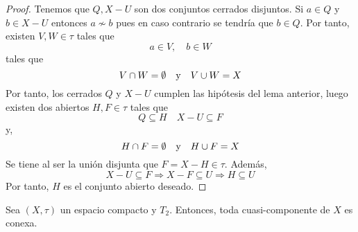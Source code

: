 \documentclass[12pt]{report}
\theoremstyle{largebreak}
\begin{document}
    \begin{proof}
        Tenemos que $Q,X-U$ son dos conjuntos cerrados disjuntos. Si $a\in Q$ y $b\in X-U$ entonces $a\nsim b$ pues en caso contrario se tendría que $b\in Q$. Por tanto, existen $V,W\in\tau$ tales que
        \begin{equation*}
            a\in V,\quad b\in W
        \end{equation*}
        tales que
        \begin{equation*}
            V\cap W=\emptyset\quad\textup{y}\quad V\cup W=X
        \end{equation*}
        Por tanto, los cerrados $Q$ y $X-U$ cumplen las hipótesis del lema anterior, luego existen dos abiertos $H,F\in\tau$ tales que
        \begin{equation}
            Q\subseteq H\quad X-U\subseteq F
        \end{equation}
        y,
        \begin{equation*}
            H\cap F=\emptyset\quad\textup{y}\quad H\cup F=X
        \end{equation*}
        Se tiene al ser la unión disjunta que $F=X-H\in\tau$. Además,
        \begin{equation*}
            X-U\subseteq F\Rightarrow X-F\subseteq U\Rightarrow H\subseteq U
        \end{equation*}
        Por tanto, $H$ es el conjunto abierto deseado.
    \end{proof}

    \begin{theor}
        Sea $(X,\tau)$ un espacio compacto y $T_2$. Entonces, toda cuasi-componente de $X$ es conexa.
    \end{theor}
\end{document}
